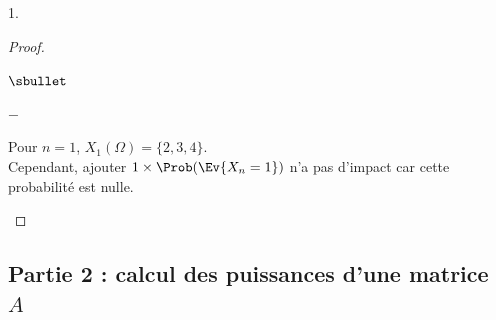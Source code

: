 \documentclass[11pt]{article}%
\begin{document}
\begin{noliste}{1.}
\begin{proof}
\begin{noliste}{$\sbullet$}
\begin{noliste}{$-$}
      \item Pour $n = 1$, $X_1(\Omega) = \{2, 3, 4\}$.\\
        Cependant, ajouter $1 \times \Prob(\Ev{X_n = 1})$ n'a pas
        d'impact car cette probabilité est nulle.\\[-1.1cm]
      \end{noliste}
    \end{noliste}
  \end{proof}

\end{noliste}

\subsection*{Partie 2 : calcul des puissances d'une matrice $A$}
\end{document}
